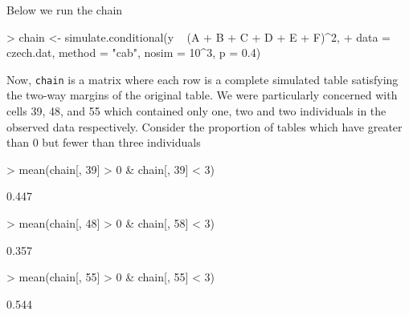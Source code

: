 \documentclass[a4paper]{article}
\begin{document}
Below we run the chain
\begin{Schunk}
\begin{Sinput}
> chain <- simulate.conditional(y ~ (A + B + C + D + E + F)^2, 
+     data = czech.dat, method = "cab", nosim = 10^3, p = 0.4)
\end{Sinput}
\end{Schunk}
Now, \texttt{chain} is a matrix where each row is a complete
simulated table satisfying the two-way margins of the original
table. We were particularly concerned with cells 39, 48, and 55 which
contained only one, two and two individuals in the observed data 
respectively. Consider the proportion of tables which have greater 
than 0 but fewer than three individuals
\begin{Schunk}
\begin{Sinput}
> mean(chain[, 39] > 0 & chain[, 39] < 3)
\end{Sinput}
\begin{Soutput}
[1] 0.447
\end{Soutput}
\begin{Sinput}
> mean(chain[, 48] > 0 & chain[, 58] < 3)
\end{Sinput}
\begin{Soutput}
[1] 0.357
\end{Soutput}
\begin{Sinput}
> mean(chain[, 55] > 0 & chain[, 55] < 3)
\end{Sinput}
\begin{Soutput}
[1] 0.544
\end{Soutput}
\end{Schunk}
\end{document}
